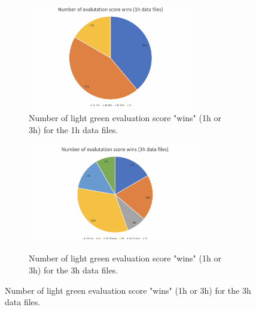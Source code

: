 \begin{figure}[H]
  \centering
  \begin{subfigure}{.475\textwidth}
    \centering
    \includegraphics[width=0.8\textwidth]{./images/clusteringResults/clusteringResultsGraph1h.png}
    \caption{Number of light green evaluation score "wins" (1h or 3h) for the 1h data files.}
    \label{figure:clusteringResultsGraph1h}
  \end{subfigure}%
  \hfill
  \begin{subfigure}{.475\textwidth}
    \centering
    \  \includegraphics[width=0.8\textwidth]{./images/clusteringResults/clusteringResultsGraph3h.png}
    \caption{Number of light green evaluation score "wins" (1h or 3h) for the 3h data files.}
    \label{figure:clusteringResultsGraph3h}
  \end{subfigure}
\end{figure}



